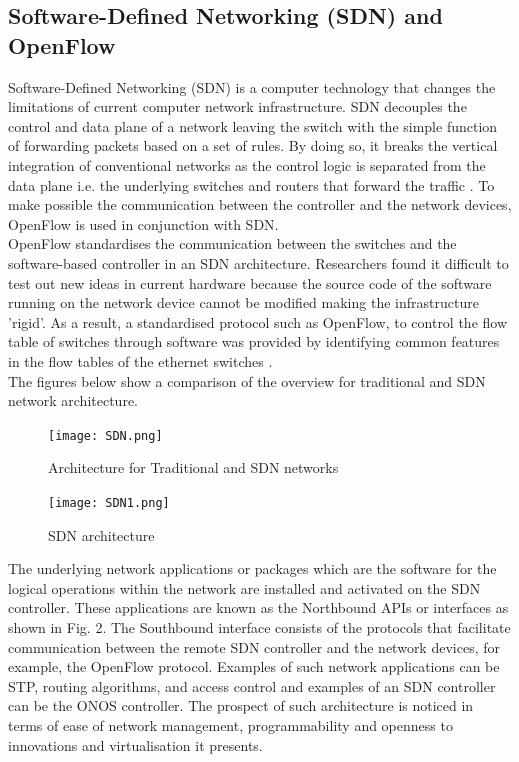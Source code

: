 \documentclass{article}
\begin{document}
\subsection{Software-Defined Networking (SDN) and OpenFlow} 
Software-Defined Networking (SDN) is a computer technology that changes the limitations of current computer network infrastructure. SDN \citep{6587999} decouples the control and data plane of a network leaving the switch with the simple function of forwarding packets based on a set of rules. By doing so, it breaks the vertical integration of conventional networks as the control logic is separated from the data plane i.e. the underlying switches and routers that forward the traffic \citep{6994333}. To make possible the communication between the controller and the network devices, OpenFlow \citep{6587999} is used in conjunction with SDN. \\ OpenFlow standardises the communication between the switches and the software-based controller in an SDN architecture. Researchers found it difficult to test out new ideas in current hardware because the source code of the software running on the network device cannot be modified making the infrastructure 'rigid'. As a result, a standardised protocol such as OpenFlow, to control the flow table of switches through software was provided by identifying common features in the flow tables of the ethernet switches \citep{6587999}.\\The figures below show a comparison of the overview for traditional and SDN network architecture.\\
	\begin{figure}[h]
        		\centering
		\small
        		\texttt{[image: SDN.png]}
        		\caption{Architecture for Traditional and SDN networks}
        		\label{fig:SDN1}
	\end{figure}
    
	\newpage
    	\begin{figure}[h]
        		\centering
		\small
        		\texttt{[image: SDN1.png]}
        		\caption{SDN architecture}
       		 \label{fig:SDN2}
    	\end{figure} 
The underlying network applications or packages which are the software for the logical operations within the network are installed and activated on the SDN controller. These applications are known as the Northbound APIs or interfaces as shown in Fig. 2. The Southbound interface consists of the protocols that facilitate communication between the remote SDN controller and the network devices, for example, the OpenFlow \citep{10220519} protocol. Examples of such network applications can be STP, routing algorithms, and access control and examples of an SDN controller can be the ONOS controller. The prospect of such architecture is noticed in terms of ease of network management, programmability and openness to innovations and virtualisation it presents.
\end{document}
